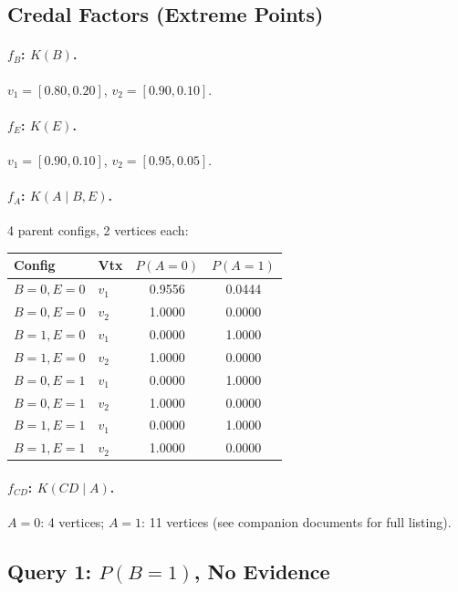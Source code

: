 \documentclass{article}
\begin{document}
\subsection{Credal Factors (Extreme Points)}

\paragraph{$f_B$: $K(B)$.} $v_1 = [0.80, 0.20]$, \; $v_2 = [0.90, 0.10]$.

\paragraph{$f_E$: $K(E)$.} $v_1 = [0.90, 0.10]$, \; $v_2 = [0.95, 0.05]$.

\paragraph{$f_A$: $K(A \mid B, E)$.} 4 parent configs, 2 vertices each:

\begin{center}
\begin{tabular}{llcc}
\toprule
\textbf{Config} & \textbf{Vtx} & $P(A{=}0)$ & $P(A{=}1)$ \\
\midrule
$B{=}0, E{=}0$ & $v_1$ & 0.9556 & 0.0444 \\
$B{=}0, E{=}0$ & $v_2$ & 1.0000 & 0.0000 \\
\midrule
$B{=}1, E{=}0$ & $v_1$ & 0.0000 & 1.0000 \\
$B{=}1, E{=}0$ & $v_2$ & 1.0000 & 0.0000 \\
\midrule
$B{=}0, E{=}1$ & $v_1$ & 0.0000 & 1.0000 \\
$B{=}0, E{=}1$ & $v_2$ & 1.0000 & 0.0000 \\
\midrule
$B{=}1, E{=}1$ & $v_1$ & 0.0000 & 1.0000 \\
$B{=}1, E{=}1$ & $v_2$ & 1.0000 & 0.0000 \\
\bottomrule
\end{tabular}
\end{center}

\paragraph{$f_{CD}$: $K(CD \mid A)$.} $A{=}0$: 4 vertices; $A{=}1$: 11 vertices (see companion documents for full listing).

\subsection{Query 1: $P(B{=}1)$, No Evidence}
\end{document}
